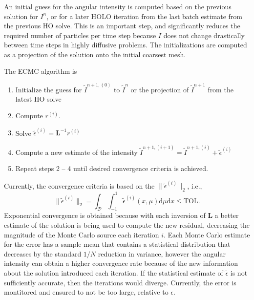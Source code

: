 \documentclass{mc2013}
\newcommand{\B}[1]{\ensuremath{\mathbf{#1}}}
\renewcommand{\d}{\mathrm{d}}
\begin{document}
An initial guess for the angular intensity is computed based on the previous solution
for $I^{n}$, or for a later HOLO iteration from the last batch estimate from the previous
HO solve. This is an important step, and significantly reduces the required number of
particles per time step because $I$ does not change drastically between time steps in
highly diffusive problems.  The initializations are
computed as a projection of the solution onto the initial coarsest mesh.

  The ECMC algorithm is
\begin{enumerate}
    \item Initialize the guess for $\tilde{I}^{n+1,(0)}$ to $\tilde{I}^{n}$ or the
        projection of $\tilde{I}^{n+1}$ from the latest HO solve
\item Compute $r^{(i)}$.
\item Solve $\tilde{\epsilon}^{(i)} = \B L^{-1} r^{(i)}$
\item Compute a new estimate of the intensity $\tilde I^{n+1,(i+1)} = \tilde I^{n+1,(i)}
+ \tilde\epsilon^{(i)}$
\item Repeat steps 2 -- 4 until desired convergence criteria is achieved. 
\end{enumerate}

Currently, the convergence criteria is based on the $\|\tilde{\epsilon}^{(i)}\|_2$, i.e.,
\begin{equation}
\|\tilde{\epsilon}^{(i)}\|_2 = \int_\mathcal{D} \int_{-1}^1
\tilde{\epsilon}^{(i)}(x,\mu) \d\mu \d x\leq \text{TOL}.
\end{equation}
Exponential convergence is obtained because with each inversion of $\B L$ a
better estimate of the solution is being used to compute the new residual, decreasing
the magnitude of the Monte Carlo source each iteration $i$.  Each Monte Carlo
estimate for the error has a sample mean that contains a statistical distribution that decreases 
by the standard $1/{N}$ reduction in variance, however the 
angular intensity can obtain a higher convergence rate because of the new information about the
solution introduced each iteration.  If the statistical estimate of $\tilde\epsilon$ is not sufficiently
accurate, then the iterations would diverge.  Currently, the error is montitored and
ensured to not be too large, relative to $\epsilon$.
\end{document}
